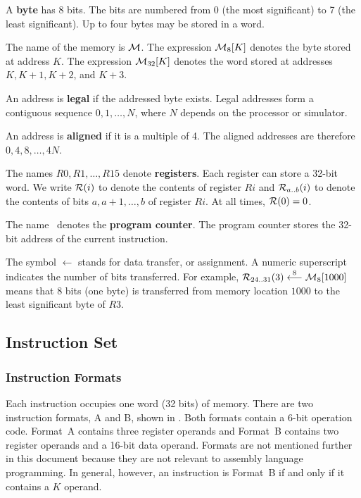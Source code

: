 A {\bf byte} has 8 bits. The bits are numbered from 0 (the most
significant) to 7 (the least significant). Up to four bytes may be stored
in a word.

The name of the memory is ${\cal M}$. The expression ${\cal M}_8[K]$ denotes
the byte stored at address $K$. The expression ${\cal M}_{32}[K]$ denotes the
word stored at addresses $K,K+1,K+2$, and $K+3$.

An address is {\bf legal} if the addressed byte exists. Legal addresses
form a contiguous sequence $0,1,\ldots,N$, where $N$ depends on the
processor or simulator.

An address is {\bf aligned} if it is a multiple of 4. The aligned
addresses are therefore $0,4,8,\ldots,4N$.

The names $R0,R1,\ldots,R15$ denote {\bf registers}. Each register can
store a 32-bit word. We write ${\cal R}(i)$ to denote the contents of
register $Ri$ and ${\cal R}_{a..b}(i)$ to denote the contents of bits
$a,a+1,\ldots,b$ of register $Ri$. At all times, ${\cal R}(0)=0$.

The name \ic\ denotes the {\bf program counter}. The program counter
stores the 32-bit address of the current instruction.

The symbol $\longleftarrow$ stands for data transfer, or assignment. A
numeric superscript indicates the number of bits transferred. For
example, $ {\cal R}_{24..31}(3) \stackrel{8}{\longleftarrow} {\cal M}_8[1000] $ means that 8 bits (one
byte) is transferred from memory location $1000$ to the least
significant byte of $R3$.

\subsection{Instruction Set}

\subsubsection{Instruction Formats}

Each instruction occupies one word (32 bits) of memory. There are two
instruction formats, A and B, shown in . Both formats contain a
6-bit operation code. Format~A contains three register operands and
Format~B contains two register operands and a 16-bit data operand.
Formats are not mentioned further in this document because they are not
relevant to assembly language programming. In general, however, an
instruction is Format~B if and only if it contains a $K$ operand.

